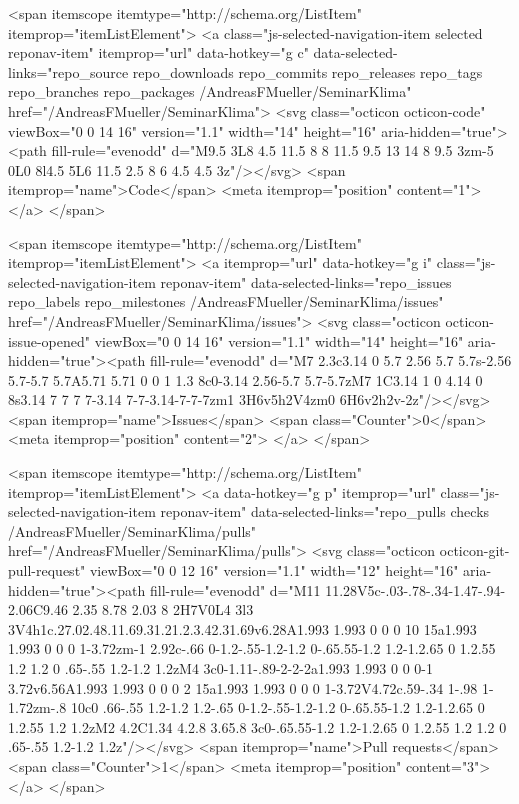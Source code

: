   <span itemscope itemtype="http://schema.org/ListItem" itemprop="itemListElement">
    <a class="js-selected-navigation-item selected reponav-item" itemprop="url" data-hotkey="g c" data-selected-links="repo_source repo_downloads repo_commits repo_releases repo_tags repo_branches repo_packages /AndreasFMueller/SeminarKlima" href="/AndreasFMueller/SeminarKlima">
      <svg class="octicon octicon-code" viewBox="0 0 14 16" version="1.1" width="14" height="16" aria-hidden="true"><path fill-rule="evenodd" d="M9.5 3L8 4.5 11.5 8 8 11.5 9.5 13 14 8 9.5 3zm-5 0L0 8l4.5 5L6 11.5 2.5 8 6 4.5 4.5 3z"/></svg>
      <span itemprop="name">Code</span>
      <meta itemprop="position" content="1">
</a>  </span>

    <span itemscope itemtype="http://schema.org/ListItem" itemprop="itemListElement">
      <a itemprop="url" data-hotkey="g i" class="js-selected-navigation-item reponav-item" data-selected-links="repo_issues repo_labels repo_milestones /AndreasFMueller/SeminarKlima/issues" href="/AndreasFMueller/SeminarKlima/issues">
        <svg class="octicon octicon-issue-opened" viewBox="0 0 14 16" version="1.1" width="14" height="16" aria-hidden="true"><path fill-rule="evenodd" d="M7 2.3c3.14 0 5.7 2.56 5.7 5.7s-2.56 5.7-5.7 5.7A5.71 5.71 0 0 1 1.3 8c0-3.14 2.56-5.7 5.7-5.7zM7 1C3.14 1 0 4.14 0 8s3.14 7 7 7 7-3.14 7-7-3.14-7-7-7zm1 3H6v5h2V4zm0 6H6v2h2v-2z"/></svg>
        <span itemprop="name">Issues</span>
        <span class="Counter">0</span>
        <meta itemprop="position" content="2">
</a>    </span>

  <span itemscope itemtype="http://schema.org/ListItem" itemprop="itemListElement">
    <a data-hotkey="g p" itemprop="url" class="js-selected-navigation-item reponav-item" data-selected-links="repo_pulls checks /AndreasFMueller/SeminarKlima/pulls" href="/AndreasFMueller/SeminarKlima/pulls">
      <svg class="octicon octicon-git-pull-request" viewBox="0 0 12 16" version="1.1" width="12" height="16" aria-hidden="true"><path fill-rule="evenodd" d="M11 11.28V5c-.03-.78-.34-1.47-.94-2.06C9.46 2.35 8.78 2.03 8 2H7V0L4 3l3 3V4h1c.27.02.48.11.69.31.21.2.3.42.31.69v6.28A1.993 1.993 0 0 0 10 15a1.993 1.993 0 0 0 1-3.72zm-1 2.92c-.66 0-1.2-.55-1.2-1.2 0-.65.55-1.2 1.2-1.2.65 0 1.2.55 1.2 1.2 0 .65-.55 1.2-1.2 1.2zM4 3c0-1.11-.89-2-2-2a1.993 1.993 0 0 0-1 3.72v6.56A1.993 1.993 0 0 0 2 15a1.993 1.993 0 0 0 1-3.72V4.72c.59-.34 1-.98 1-1.72zm-.8 10c0 .66-.55 1.2-1.2 1.2-.65 0-1.2-.55-1.2-1.2 0-.65.55-1.2 1.2-1.2.65 0 1.2.55 1.2 1.2zM2 4.2C1.34 4.2.8 3.65.8 3c0-.65.55-1.2 1.2-1.2.65 0 1.2.55 1.2 1.2 0 .65-.55 1.2-1.2 1.2z"/></svg>
      <span itemprop="name">Pull requests</span>
      <span class="Counter">1</span>
      <meta itemprop="position" content="3">
</a>  </span>

